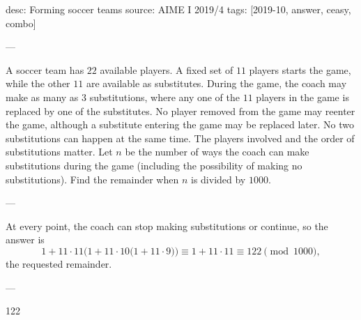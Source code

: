 desc: Forming soccer teams
source: AIME I 2019/4
tags: [2019-10, answer, ceasy, combo]

---

A soccer team has $22$ available players. A fixed set of $11$ players starts the game, while the other $11$ are available as substitutes. During the game, the coach may make as many as $3$ substitutions, where any one of the $11$ players in the game is replaced by one of the substitutes. No player removed from the game may reenter the game, although a substitute entering the game may be replaced later. No two substitutions can happen at the same time. The players involved and the order of substitutions matter. Let $n$ be the number of ways the coach can make substitutions during the game (including the possibility of making no substitutions). Find the remainder when $n$ is divided by $1000$.

---

At every point, the coach can stop making substitutions or continue, so the answer is \[1+11\cdot 11\Big(1+11\cdot 10\big(1+11\cdot 9\big)\Big)\equiv 1+11\cdot 11\equiv 122\pmod{1000},\]
the requested remainder.

---

122
